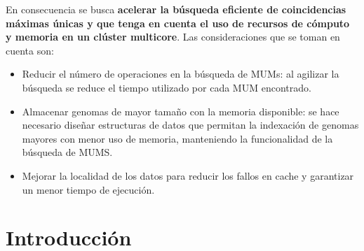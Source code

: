 \documentclass[12pt,a4paper]{article}
\begin{document}
\indent
En consecuencia se busca \textbf{acelerar la búsqueda eficiente de 
coincidencias máximas únicas y que tenga en cuenta el uso de recursos de cómputo y
memoria en un clúster multicore}. Las consideraciones que se toman en cuenta son:
\begin{itemize}
\item Reducir el número de operaciones en la búsqueda de MUMs: al agilizar la búsqueda se reduce el tiempo utilizado por cada MUM encontrado.
\item Almacenar genomas de mayor tamaño con la memoria disponible: se hace necesario diseñar estructuras de datos que permitan la indexación de genomas mayores con menor uso de memoria, manteniendo la funcionalidad de la búsqueda de MUMS.
\item Mejorar la localidad de los datos para reducir los fallos en cache y garantizar un menor tiempo de ejecución.\end{itemize}
\section{Introducción} 
\end{document}

